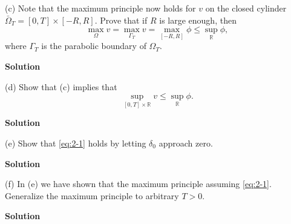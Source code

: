 \documentclass{article}
\begin{document}
\vspace{5mm}

(c) Note that the maximum principle now holds for $v$ on the closed
cylinder $\bar{\Omega}_T = [0, T] \times [-R, R]$. Prove that if $R$ is
large enough, then
%
\begin{equation*}
    \max_\Omega v = \max_{\Gamma_T} v = \max_{[-R, R]} \phi \leq \sup_\mathbb{R} \phi
    ,
\end{equation*}
%
where $\Gamma_T$ is the parabolic boundary of $\Omega_T$.

\textbf{Solution}

\vspace{5mm}

(d) Show that (c) implies that
%
\begin{equation*}
    \sup_{[0, T] \times \mathbb{R}} v \leq \sup_\mathbb{R} \phi
    .
\end{equation*}

\textbf{Solution}

\vspace{5mm}

(e) Show that \eqref{eq:2-1} holds by letting $\delta_0$ approach zero.

\textbf{Solution}

\vspace{5mm}

(f) In (e) we have shown that the maximum principle assuming
\eqref{eq:2-1}. Generalize the maximum principle to arbitrary $T > 0$.

\textbf{Solution}
\end{document}
